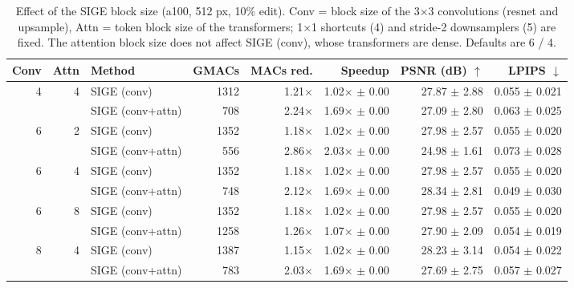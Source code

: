 \begin{table}[t]
\centering
\small
\caption{Effect of the SIGE block size (a100, 512 px, 10\% edit). Conv = block size of the 3$\times$3 convolutions (resnet and upsample), Attn = token block size of the transformers; 1$\times$1 shortcuts (4) and stride-2 downsamplers (5) are fixed. The attention block size does not affect SIGE (conv), whose transformers are dense. Defaults are 6 / 4.}
\label{tab:block_size_a100}
\begin{tabular}{rrlrrrrr}
\toprule
Conv & Attn & Method & GMACs & MACs red. & Speedup & PSNR (dB) $\uparrow$ & LPIPS $\downarrow$ \\
\midrule
4 & 4 & SIGE (conv) & 1312 & 1.21$\times$ & 1.02$\times$ $\pm$ 0.00 & 27.87 $\pm$ 2.88 & 0.055 $\pm$ 0.021 \\
 &  & SIGE (conv+attn) & 708 & 2.24$\times$ & 1.69$\times$ $\pm$ 0.00 & 27.09 $\pm$ 2.80 & 0.063 $\pm$ 0.025 \\
\midrule
6 & 2 & SIGE (conv) & 1352 & 1.18$\times$ & 1.02$\times$ $\pm$ 0.00 & 27.98 $\pm$ 2.57 & 0.055 $\pm$ 0.020 \\
 &  & SIGE (conv+attn) & 556 & 2.86$\times$ & 2.03$\times$ $\pm$ 0.00 & 24.98 $\pm$ 1.61 & 0.073 $\pm$ 0.028 \\
\midrule
6 & 4 & SIGE (conv) & 1352 & 1.18$\times$ & 1.02$\times$ $\pm$ 0.00 & 27.98 $\pm$ 2.57 & 0.055 $\pm$ 0.020 \\
 &  & SIGE (conv+attn) & 748 & 2.12$\times$ & 1.69$\times$ $\pm$ 0.00 & 28.34 $\pm$ 2.81 & 0.049 $\pm$ 0.030 \\
\midrule
6 & 8 & SIGE (conv) & 1352 & 1.18$\times$ & 1.02$\times$ $\pm$ 0.00 & 27.98 $\pm$ 2.57 & 0.055 $\pm$ 0.020 \\
 &  & SIGE (conv+attn) & 1258 & 1.26$\times$ & 1.07$\times$ $\pm$ 0.00 & 27.90 $\pm$ 2.09 & 0.054 $\pm$ 0.019 \\
\midrule
8 & 4 & SIGE (conv) & 1387 & 1.15$\times$ & 1.02$\times$ $\pm$ 0.00 & 28.23 $\pm$ 3.14 & 0.054 $\pm$ 0.022 \\
 &  & SIGE (conv+attn) & 783 & 2.03$\times$ & 1.69$\times$ $\pm$ 0.00 & 27.69 $\pm$ 2.75 & 0.057 $\pm$ 0.027 \\
\bottomrule
\end{tabular}
\end{table}

